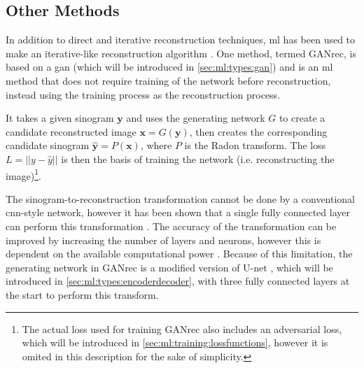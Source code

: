 \subsection{Other Methods}
In addition to direct and iterative reconstruction techniques, \acrshort{ml} has been used to make an iterative-like reconstruction algorithm \cite{GANrec}. One method, termed GANrec, is based on a \acrshort{gan} (which will be introduced in \cref{sec:ml:types:gan}) and is an \acrshort{ml} method that does not require training of the network before reconstruction, instead using the training process as the reconstruction process. 

It takes a given sinogram $\bm{y}$ and uses the generating network $G$ to create a candidate reconstructed image $\bm{x} = G(\bm{y})$, then creates the corresponding candidate sinogram $\hat{\bm{y}} = P(\bm{x})$, where $P$ is the Radon transform. The loss $L = \left|\left| y - \hat{y} \right|\right|$ is then the basis of training the network (i.e. reconstructing the image)\footnote{The actual loss used for training GANrec also includes an adversarial loss, which will be introduced in \cref{sec:ml:training:lossfunctions}, however it is omited in this description for the sake of simplicity. }.

The sinogram-to-reconstruction transformation cannot be done by a conventional \acrshort{cnn}-style network, however it has been shown that a single fully connected layer can perform this transformation \cite{PASCHALIS2004211}. The accuracy of the transformation can be improved by increasing the number of layers and neurons, however this is dependent on the available computational power \cite{GANrec}. Because of this limitation, the generating network in GANrec is a modified version of U-net \cite{unet}, which will be introduced in \cref{sec:ml:types:encoderdecoder}, with three fully connected layers at the start to perform this transform. 